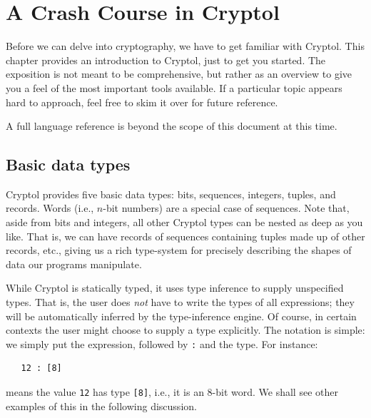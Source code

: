 
\chapter{A Crash Course in Cryptol}
\label{cha:crash-course-cryptol}

Before we can delve into cryptography, we have to get familiar with
Cryptol.  This chapter provides an introduction to Cryptol, just to
get you started. The exposition is not meant to be comprehensive, but
rather as an overview to give you a feel of the most important tools
available.  If a particular topic appears hard to approach, feel free
to skim it over for future reference.

A full language reference is beyond the scope of this document at this
time.


\section{Basic data types}
\label{sec:basic-data-types}

Cryptol provides five basic data types: bits, sequences, integers,
tuples, and records. Words (i.e., $n$-bit numbers) are a special case
of sequences. Note that, aside from bits and integers, all other
Cryptol types can be nested as deep as you like. That is, we can have
records of sequences containing tuples made up of other records, etc.,
giving us a rich type-system for precisely describing the shapes of
data our programs manipulate.

While Cryptol is statically typed, it uses type inference to supply
unspecified types.  That is, the user does {\em not} have to write the
types of all expressions; they will be automatically inferred by the
type-inference engine.  Of course, in certain contexts the user might
choose to supply a type explicitly.  The notation is simple: we simply
put the expression, followed by {\tt :} and the type. For instance:
\begin{Verbatim}
   12 : [8]
\end{Verbatim}
means the value {\tt 12} has type {\tt [8]}, i.e., it is an 8-bit
word. We shall see other examples of this in the following discussion.

